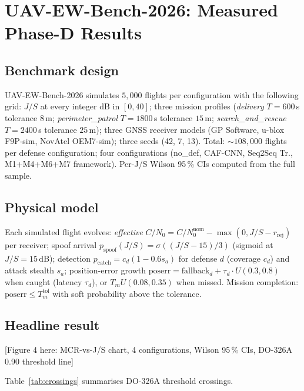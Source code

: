 \documentclass[10pt,journal,compsoc,twoside]{IEEEtran}
\begin{document}
\section{UAV-EW-Bench-2026: Measured Phase-D Results}
\label{sec:results}

\subsection{Benchmark design}
UAV-EW-Bench-2026 simulates $5{,}000$ flights per configuration with
the following grid: $J/S$ at every integer dB in $[0, 40]$; three
mission profiles (\textit{delivery} $T{=}600$\,s tolerance $8$\,m;
\textit{perimeter\_patrol} $T{=}1800$\,s tolerance $15$\,m;
\textit{search\_and\_rescue} $T{=}2400$\,s tolerance $25$\,m);
three GNSS receiver models (GP Software, u-blox F9P-sim, NovAtel OEM7-sim);
three seeds (42, 7, 13). Total: $\sim$$108{,}000$ flights per
defense configuration; four configurations (no\_def, CAF-CNN, Seq2Seq
Tr., M1+M4+M6+M7 framework). Per-J/S Wilson 95\,\% CIs computed
from the full sample.

\subsection{Physical model}
Each simulated flight evolves: \emph{effective} $C/N_0 = C/N_0^{\text{nom}}
- \max(0, J/S - r_{\text{rej}})$ per receiver; spoof arrival
$p_{\text{spoof}}(J/S) = \sigma((J/S - 15)/3)$ (sigmoid at $J/S=15$\,dB);
detection $p_{\text{catch}} = c_d (1 - 0.6 s_a)$ for defense $d$
(coverage $c_d$) and attack stealth $s_a$; position-error growth
$\text{poserr} = \text{fallback}_d + \tau_d \cdot U(0.3, 0.8)$ when
caught (latency $\tau_d$), or $T_m U(0.08, 0.35)$ when missed.
Mission completion: $\text{poserr} \le T_m^{\text{tol}}$ with
soft probability above the tolerance.

\subsection{Headline result}
[Figure 4 here: MCR-vs-J/S chart, 4 configurations, Wilson 95\,\% CIs,
DO-326A 0.90 threshold line]

Table~\ref{tab:crossings} summarises DO-326A threshold crossings.
\end{document}
